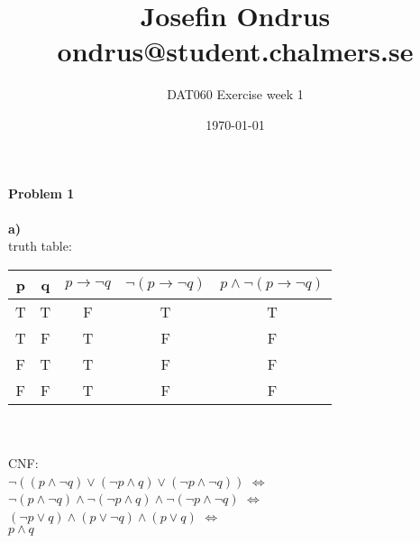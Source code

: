 \documentclass[12pt,oneside,reqno]{amsart}
\begin{document}
\setlength{\parindent}{6pt}
\def\code#1{\texttt{#1}} %
\def\ra{\rightarrow{}} %
\newcommand{\itab}[1]{\hspace{0em}\rlap{#1}}
\newcommand{\tab}[1]{\hspace{.2\textwidth}\rlap{#1}}
\raggedbottom

\title{Josefin Ondrus\\ondrus@student.chalmers.se}
\author{DAT060 Exercise week 1}
\date{\today}
\maketitle

\textbf{Problem 1}\\\\
\textbf{a)}\\
truth table:\\
	\begin{tabular}{ cc|c|c|c }
		p & q & $p \ra \neg q$ & $\neg(p \ra \neg q)$ & $p \land \neg(p \ra \neg q)$ \\ \hline
		T & T & F & T & T \\
		T & F & T & F & F \\
		F & T & T & F & F \\
		F & F & T & F & F \\
	\end{tabular}\\\\
CNF:\\
$\neg((p \land \neg q) \lor (\neg p \land q) \lor (\neg p \land \neg q))$
$\Leftrightarrow$\\
$\neg(p \land \neg q) \land \neg(\neg p \land q) \land \neg(\neg p \land \neg q)$
$\Leftrightarrow$\\
$(\neg p \lor q) \land (p \lor \neg q) \land (p \lor q)$
$\Leftrightarrow$\\
$p \land q$ \\\\
\end{document}
